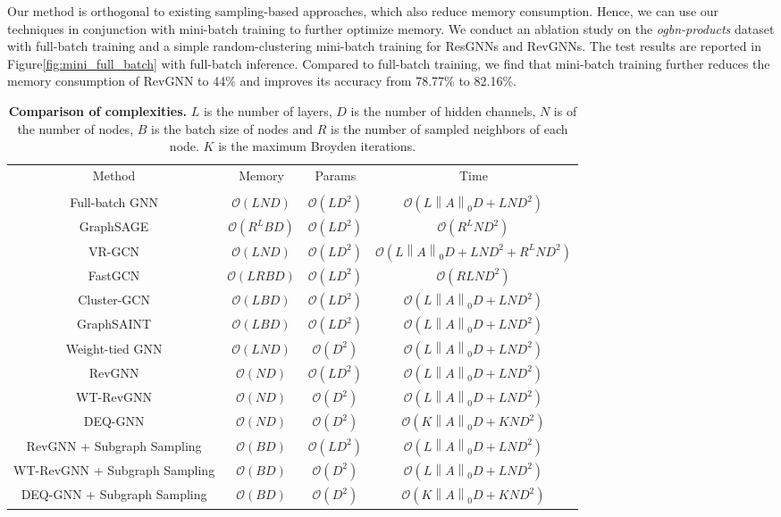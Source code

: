 \documentclass{article}
\newcommand\norm[1]{\left\lVert#1\right\rVert}
\newcommand{\figLabel}{Figure\xspace}
\begin{document}
Our method is orthogonal to existing sampling-based approaches, which also reduce memory consumption. Hence, we can use our techniques in conjunction with mini-batch training to further optimize memory.
We conduct an ablation study on the \emph{ogbn-products} dataset \citep{hu2020open} with full-batch training and a simple random-clustering mini-batch training for ResGNNs and RevGNNs. The test results are reported in \figLabel \ref{fig:mini_full_batch} with full-batch inference. Compared to full-batch training, we find that mini-batch training further reduces the memory consumption of RevGNN to 44\% and improves its accuracy from 78.77\% to 82.16\%.

\begin{table*}[ht]
\vspace{-8pt}
\centering
\setlength{\tabcolsep}{5pt}
\caption{\textbf{Comparison of complexities.} $L$ is the number of layers, $D$ is the number of hidden channels, $N$ is of the number of nodes, $B$ is the batch size of nodes and $R$ is the number of sampled neighbors of each node. $K$ is the maximum Broyden iterations.}
\vspace{2pt}
\begin{tabular}{cccc}
\toprule
  \label{table:cplx}
  \centering
Method & Memory & Params & Time \\\\
\midrule
Full-batch GNN & $\mathcal{O}(LND)$ & $\mathcal{O}(LD^{2})$ & $\mathcal{O}(L\norm{A}_0D + LND^{2})$ \\
GraphSAGE & $\mathcal{O}(R^{L}BD)$ & $\mathcal{O}(LD^{2})$ & $\mathcal{O}(R^LND^{2})$\\
VR-GCN & $\mathcal{O}(LND)$ & $\mathcal{O}(LD^{2})$ & $\mathcal{O}(L\norm{A}_0D + LND^{2} + R^LND^{2})$ \\
FastGCN & $\mathcal{O}(LRBD)$ & $\mathcal{O}(LD^{2})$ & $\mathcal{O}(RLND^{2})$ \\
Cluster-GCN & $\mathcal{O}(LBD)$ & $\mathcal{O}(LD^{2})$ & $\mathcal{O}(L\norm{A}_0D + LND^{2})$ \\
GraphSAINT & $\mathcal{O}(LBD)$ & $\mathcal{O}(LD^{2})$ & $\mathcal{O}(L\norm{A}_0D + LND^{2})$ \\
Weight-tied GNN & $\mathcal{O}(LND)$ & $\mathcal{O}(D^{2})$ & $\mathcal{O}(L\norm{A}_0D + LND^{2})$ \\
\midrule
RevGNN & $\mathcal{O}(ND)$ & $\mathcal{O}(LD^{2})$ & $\mathcal{O}(L\norm{A}_0D + LND^{2})$ \\
WT-RevGNN & $\mathcal{O}(ND)$ & $\mathcal{O}(D^{2})$ & $\mathcal{O}(L\norm{A}_0D + LND^{2})$ \\
DEQ-GNN & $\mathcal{O}(ND)$ & $\mathcal{O}(D^{2})$ & $\mathcal{O}(K\norm{A}_0D + KND^{2})$ \\
\midrule
RevGNN + Subgraph Sampling & $\mathcal{O}(BD)$ & $\mathcal{O}(LD^{2})$ & $\mathcal{O}(L\norm{A}_0D + LND^{2})$\\
WT-RevGNN + Subgraph Sampling & $\mathcal{O}(BD)$ & $\mathcal{O}(D^{2})$ & $\mathcal{O}(L\norm{A}_0D + LND^{2})$ \\
DEQ-GNN + Subgraph Sampling & $\mathcal{O}(BD)$ & $\mathcal{O}(D^{2})$ & $\mathcal{O}(K\norm{A}_0D + KND^{2})$ \\
\bottomrule
\end{tabular}
\end{table*}
\end{document}
